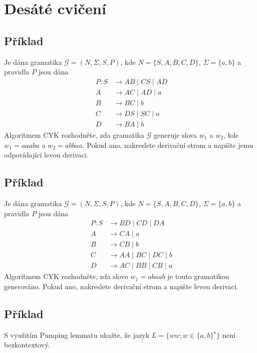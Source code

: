 \section{Desáté cvičení}

\subsection{Příklad}
Je dána gramatika $\mathcal{G} = (N, \Sigma, S, P)$, kde $N = \{S, A, B, C, D\}$, $\Sigma = \{a,b\}$ a pravidla $P$ jsou 
dána
\begin{align*}
    P: S &\rightarrow AB \mid CS \mid AD\\
    A &\rightarrow AC \mid AD \mid a\\
    B &\rightarrow BC \mid b\\
    C &\rightarrow DS \mid SC \mid a\\
    D &\rightarrow BA \mid b
\end{align*}
Algoritmem CYK rozhodněte, zda gramatika $\mathcal{G}$ generuje slova $w_1$ a $w_2$, kde $w_1 = aaaba$ a $w_2 = abbaa$. 
Pokud ano, nakreslete derivační strom a napište jemu odpovídající levou derivaci.

\subsection{Příklad}
Je dána gramatika $\mathcal{G} = (N, \Sigma, S, P)$, kde $N = \{S, A, B, C, D\}$, $\Sigma = \{a,b\}$ a pravidla $P$ jsou 
dána
\begin{align*}
    P: S &\rightarrow BD \mid CD \mid DA\\
    A &\rightarrow CA \mid a\\
    B &\rightarrow CB \mid b\\
    C &\rightarrow AA \mid BC \mid DC \mid b\\
    D &\rightarrow AC \mid BB \mid CB \mid a
\end{align*}
Algoritmem CYK rozhodněte, zda slovo $w_1 = abaab$ je touto gramatikou generováno. Pokud ano, nakreslete derivační strom 
a napište levou derivaci.

\subsection{Příklad}
S využitím Pumping lemmatu ukažte, že jazyk $L = \{ww;w \in \{a,b\}^\star\}$ není bezkontextový.

